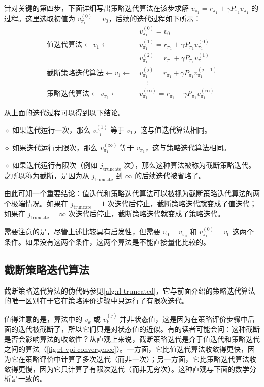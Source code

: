 针对关键的第四步，下面详细写出策略迭代算法在该步求解 $v_{\pi_1} = r_{\pi_1} + \gamma P_{\pi_1} v_{\pi_1}$ 的过程。这里选取初值为 $v_{\pi_1}^{(0)} = v_0$，后续的迭代过程如下所示：
$$
\begin{aligned}
& v_{\pi_{1}}^{(0)} = v_{0} \\
\text{值迭代算法} \leftarrow v_{1} \longleftarrow\ & v_{\pi_{1}}^{(1)} = r_{\pi_{1}} + \gamma P_{\pi_{1}} v_{\pi_{1}}^{(0)} \\
& v_{\pi_{1}}^{(2)} = r_{\pi_{1}} + \gamma P_{\pi_{1}} v_{\pi_{1}}^{(1)} \\
\text{截断策略迭代算法} \leftarrow \bar{v}_{1} \longleftarrow\ & v_{\pi_{1}}^{(j)} = r_{\pi_{1}} + \gamma P_{\pi_{1}} v_{\pi_{1}}^{(j-1)} \\
& \quad\vdots \\
\text{策略迭代算法} \leftarrow v_{\pi_{1}} \longleftarrow\ & v_{\pi_{1}}^{(\infty)} = r_{\pi_{1}} + \gamma P_{\pi_{1}} v_{\pi_{1}}^{(\infty)}
\end{aligned}
$$

从上面的迭代过程可以得到以下结论。

$\diamond$ 如果迭代运行一次，那么 $v_{\pi_{1}}^{(1)}$ 等于 $v_{1}$，这与值迭代算法相同。

$\diamond$ 如果迭代运行无限次，那么 $v_{\pi_{1}}^{(\infty)}$ 等于 $v_{\pi_{1}}$，这与策略迭代算法相同。

$\diamond$ 如果迭代运行有限次（例如 $j_{\mathrm{truncate}}$ 次），那么这种算法被称为截断策略迭代。之所以称为截断，是因为从 $j_{\mathrm{truncate}}$ 到 $\infty$ 的后续迭代被省略了。

由此可知一个重要结论：值迭代和策略迭代算法可以被视为截断策略迭代算法的两个极端情况。如果在 $j_{\mathrm{truncate}} = 1$ 次迭代后停止，截断策略迭代就变成了值迭代；如果在 $j_{\mathrm{truncate}} = \infty$ 次迭代后停止，截断策略迭代就变成了策略迭代。

需要注意的是，尽管上述比较具有启发性，但需要 $v_{0} = v_{\pi_{0}}$ 和 $v_{\pi_1}^{(0)} = v_0$ 这两个条件。如果没有这两个条件，这两个算法是不能直接量化比较的。

\subsection{截断策略迭代算法}
\label{sec:rl-vpi-truncated-algo}

截断策略迭代算法的伪代码参见\cref{alg:rl-truncated}，它与前面介绍的策略迭代算法的唯一区别在于它在策略评价步骤中只运行了有限次迭代。

值得注意的是，算法中的 $v_{k}$ 或 $v_{k}^{(j)}$ 并非状态值，这是因为在策略评价步骤中后面的迭代被截断了，所以它们只是对状态值的近似。有的读者可能会问：这种截断是否会影响算法的收敛性？从直观上来说，截断策略迭代是介于值迭代和策略迭代之间的算法（\cref{fig:rl-vpi-convergence}）。一方面，它比值迭代算法收敛得更快，因为它在策略评价中计算了多次迭代（而非一次）；另一方面，它比策略迭代算法收敛得更慢，因为它只计算了有限次迭代（而非无穷次）。这种直观与下面的数学分析是一致的。

